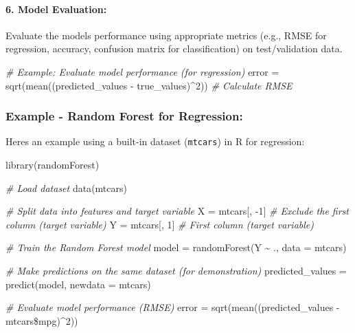 \documentclass[
]{article}
\newenvironment{Shaded}{}{}
\newcommand{\AttributeTok}[1]{\textcolor[rgb]{0.49,0.56,0.16}{#1}}
\newcommand{\CommentTok}[1]{\textcolor[rgb]{0.38,0.63,0.69}{\textit{#1}}}
\newcommand{\DecValTok}[1]{\textcolor[rgb]{0.25,0.63,0.44}{#1}}
\newcommand{\FunctionTok}[1]{\textcolor[rgb]{0.02,0.16,0.49}{#1}}
\newcommand{\NormalTok}[1]{#1}
\newcommand{\OtherTok}[1]{\textcolor[rgb]{0.00,0.44,0.13}{#1}}
\newcommand{\SpecialCharTok}[1]{\textcolor[rgb]{0.25,0.44,0.63}{#1}}
\begin{document}
\hypertarget{6-model-evaluation}{%
\paragraph{\texorpdfstring{6. \textbf{Model
Evaluation:}}{6. Model Evaluation:}}\label{6-model-evaluation}}

Evaluate the model\textquotesingle s performance using appropriate
metrics (e.g., RMSE for regression, accuracy, confusion matrix for
classification) on test/validation data.

\begin{Shaded}
\begin{Highlighting}[]
\CommentTok{\# Example: Evaluate model performance (for regression)}
\NormalTok{error }\OtherTok{=} \FunctionTok{sqrt}\NormalTok{(}\FunctionTok{mean}\NormalTok{((predicted\_values }\SpecialCharTok{{-}}\NormalTok{ true\_values)}\SpecialCharTok{\^{}}\DecValTok{2}\NormalTok{))  }\CommentTok{\# Calculate RMSE}
\end{Highlighting}
\end{Shaded}

\hypertarget{example---random-forest-for-regression}{%
\subsubsection{Example - Random Forest for
Regression:}\label{example---random-forest-for-regression}}

Here\textquotesingle s an example using a built-in dataset
(\texttt{mtcars}) in R for regression:

\begin{Shaded}
\begin{Highlighting}[]
\FunctionTok{library}\NormalTok{(randomForest)}

\CommentTok{\# Load dataset}
\FunctionTok{data}\NormalTok{(mtcars)}

\CommentTok{\# Split data into features and target variable}
\NormalTok{X }\OtherTok{=}\NormalTok{ mtcars[, }\SpecialCharTok{{-}}\DecValTok{1}\NormalTok{]  }\CommentTok{\# Exclude the first column (target variable)}
\NormalTok{Y }\OtherTok{=}\NormalTok{ mtcars[, }\DecValTok{1}\NormalTok{]   }\CommentTok{\# First column (target variable)}

\CommentTok{\# Train the Random Forest model}
\NormalTok{model }\OtherTok{=} \FunctionTok{randomForest}\NormalTok{(Y }\SpecialCharTok{\textasciitilde{}}\NormalTok{ ., }\AttributeTok{data =}\NormalTok{ mtcars)}

\CommentTok{\# Make predictions on the same dataset (for demonstration)}
\NormalTok{predicted\_values }\OtherTok{=} \FunctionTok{predict}\NormalTok{(model, }\AttributeTok{newdata =}\NormalTok{ mtcars)}

\CommentTok{\# Evaluate model performance (RMSE)}
\NormalTok{error }\OtherTok{=} \FunctionTok{sqrt}\NormalTok{(}\FunctionTok{mean}\NormalTok{((predicted\_values }\SpecialCharTok{{-}}\NormalTok{ mtcars}\SpecialCharTok{\$}\NormalTok{mpg)}\SpecialCharTok{\^{}}\DecValTok{2}\NormalTok{))}
\end{Highlighting}
\end{Shaded}
\end{document}
